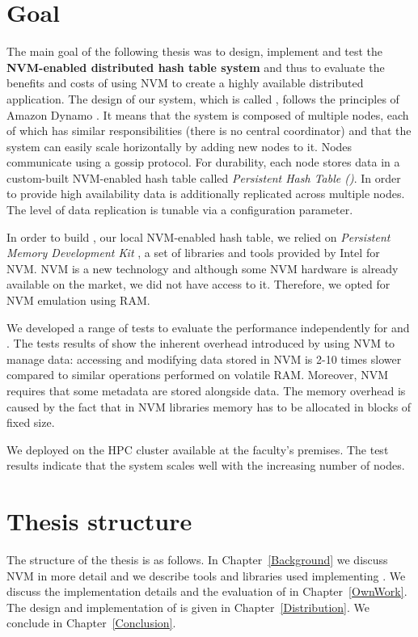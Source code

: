 \section{Goal}

The main goal of the following thesis was to design, implement and test the \textbf{NVM-enabled distributed hash table system} and thus to evaluate the benefits and costs of using NVM to create a highly available distributed application. 
The design of our system, which is called \DHTS, follows the principles of Amazon Dynamo \cite{AmazonDynamo}. It means that the system is composed of multiple nodes, each of which has similar responsibilities (there is no central coordinator) and that the system can easily scale horizontally by adding new nodes to it. Nodes communicate using a gossip protocol. For durability, each node stores data in a custom-built NVM-enabled hash table called \emph{Persistent Hash Table (\PHT)}. In order to provide high availability data is additionally replicated across multiple nodes. The level of data replication is tunable via a configuration parameter.

In order to build \PHT, our local NVM-enabled hash table, we relied on \emph{Persistent Memory Development Kit} \cite{PmemIo}, a set of libraries and tools provided by Intel for NVM. NVM is a new technology and although some NVM hardware is already available on the market, we did not have access to it. Therefore, we opted for NVM emulation using RAM.

We developed a range of tests to evaluate the performance independently for \PHT and \DHTS. The tests results of \PHT show the inherent overhead introduced by using NVM to manage data: accessing and modifying data stored in NVM is 2-10 times slower compared to similar operations performed on volatile RAM. Moreover, NVM requires that some metadata are stored alongside data. The memory overhead is caused by the fact that in NVM libraries memory has to be allocated in blocks of fixed size. 

We deployed \DHTS on the HPC cluster available at the faculty's premises. The test results indicate that the system scales well with the increasing number of nodes.

\section{Thesis structure}

The structure of the thesis is as follows. In Chapter~\ref{Background} we discuss NVM in more detail and we describe tools and libraries used implementing \DHTS. We discuss the implementation details and the evaluation of \PHT in Chapter~\ref{OwnWork}. The design and implementation of \DHTS is given in Chapter~\ref{Distribution}. We conclude in Chapter~\ref{Conclusion}.

